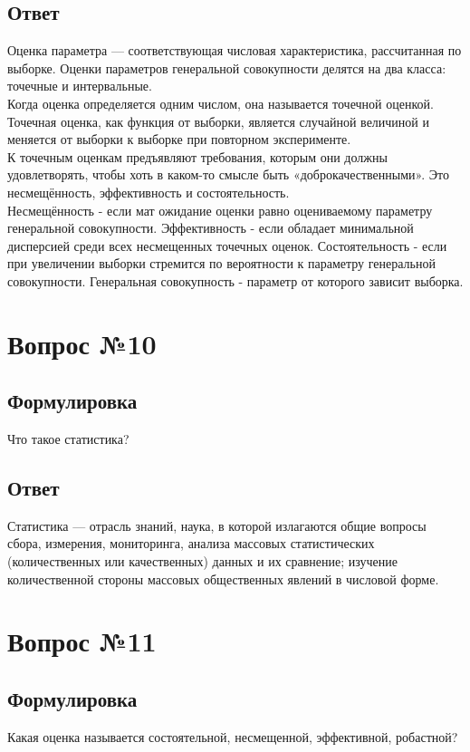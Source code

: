 \documentclass[a4]{article}
\begin{document}
	\subsection*{Ответ}
	Оценка параметра — соответствующая числовая характеристика, рассчитанная по выборке. Оценки параметров генеральной совокупности делятся на два класса: точечные и интервальные.\\
	Когда оценка определяется одним числом, она называется точечной оценкой. Точечная оценка, как функция от выборки, является случайной величиной и меняется от выборки к выборке при повторном эксперименте.\\
	К точечным оценкам предъявляют требования, которым они должны удовлетворять, чтобы хоть в каком-то смысле быть «доброкачественными». Это несмещённость, эффективность и состоятельность.\\
	Несмещённость - если мат ожидание оценки равно оцениваемому параметру генеральной совокупности. Эффективность - если обладает минимальной дисперсией среди всех несмещенных точечных оценок. Состоятельность - если при увеличении выборки стремится по вероятности к параметру генеральной совокупности. Генеральная совокупность - параметр от которого зависит выборка.
	
	\section{Вопрос №10}
	\subsection*{Формулировка}
	Что такое статистика?
	\subsection*{Ответ}
	Статистика — отрасль знаний, наука, в которой излагаются общие вопросы сбора, измерения, мониторинга, анализа массовых статистических (количественных или качественных) данных и их сравнение; изучение количественной стороны массовых общественных явлений в числовой форме.
	
	\section{Вопрос №11}
	\subsection*{Формулировка}
	Какая оценка называется состоятельной, несмещенной, эффективной, робастной?
\end{document}
